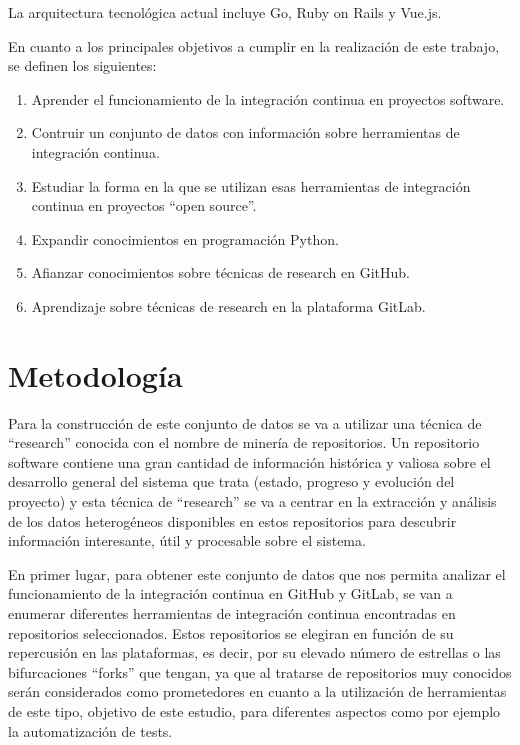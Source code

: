 La arquitectura tecnológica actual incluye Go, Ruby on Rails y Vue.js.

En cuanto a los principales objetivos a cumplir en la realización de este trabajo, se definen los siguientes:
\begin{enumerate}
    \item Aprender el funcionamiento de la integración continua en proyectos software.
    \item Contruir un conjunto de datos con información sobre herramientas de integración continua.
    \item Estudiar la forma en la que se utilizan esas herramientas de integración continua en proyectos ``open source''.
    \item Expandir conocimientos en programación Python.
    \item Afianzar conocimientos sobre técnicas de research en GitHub.
    \item Aprendizaje sobre técnicas de research en la plataforma GitLab.
\end{enumerate}

\section{Metodología}

Para la construcción de este conjunto de datos se va a utilizar una técnica de ``research'' conocida con el nombre de minería de repositorios.
Un repositorio software contiene una gran cantidad de información histórica y valiosa sobre el desarrollo general del sistema que trata (estado, progreso y evolución del proyecto) y esta técnica de ``research'' se va a centrar en la extracción y análisis de los datos heterogéneos disponibles en estos repositorios para descubrir información interesante, útil y procesable sobre el sistema.

En primer lugar, para obtener este conjunto de datos que nos permita analizar el funcionamiento de la integración continua en GitHub y GitLab, se van a enumerar diferentes herramientas de integración continua encontradas en repositorios seleccionados. 
Estos repositorios se elegiran en función de su repercusión en las plataformas, es decir, por su elevado número de estrellas o las bifurcaciones ``forks'' que tengan, ya que al tratarse de repositorios muy conocidos serán considerados como prometedores en cuanto a la utilización de herramientas de este tipo, objetivo de este estudio, para diferentes aspectos como por ejemplo la automatización de tests.

